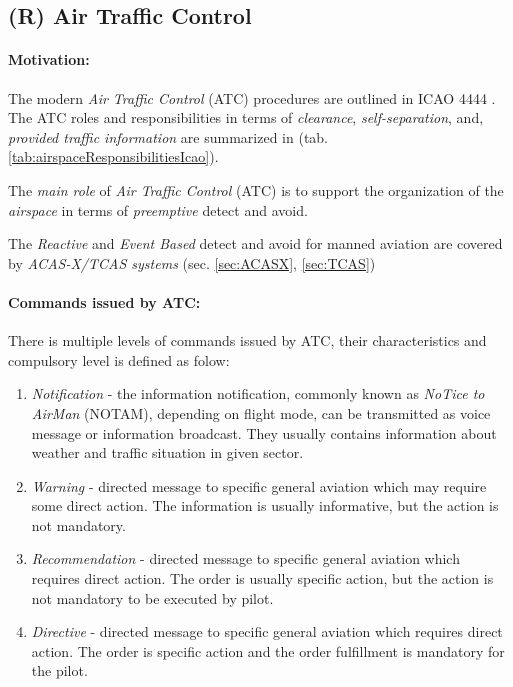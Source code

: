 \subsection{(R) Air Traffic Control}\label{sec:AirTrafficControl}
\paragraph{Motivation:} The modern \emph{Air Traffic Control} (ATC) procedures are outlined in ICAO 4444 \cite{icao4444}. The ATC roles and responsibilities in terms of \emph{clearance}, \emph{self-separation}, and, \emph{provided traffic information} are summarized in (tab. \ref{tab:airspaceResponsibilitiesIcao}). 

The \emph{main role} of \emph{Air Traffic Control} (ATC) is to support the organization of the \emph{airspace} in terms of \emph{preemptive} detect and avoid.

\begin{note}
    The \emph{Reactive} and \emph{Event Based} detect and avoid for manned aviation are covered by \emph{ACAS-X/TCAS systems} (sec. \ref{sec:ACASX}, \ref{sec:TCAS})
\end{note}

\paragraph{Commands issued by ATC:} There is multiple levels of commands issued by ATC, their characteristics and compulsory level is defined as folow:

\begin{enumerate}
    \item \emph{Notification} - the information notification, commonly known as \emph{NoTice to AirMan} (NOTAM), depending on flight mode, can be transmitted as voice message or information broadcast. They usually contains information about weather and traffic situation in given sector.
    
    \item \emph{Warning} - directed message to specific general aviation  which may require some direct action. The information is usually informative, but the action is not mandatory.
    
    \item \emph{Recommendation} - directed message to specific general aviation  which requires direct action. The order is usually specific action, but the action is not mandatory to be executed by pilot.
    
    \item \emph{Directive} - directed message to specific general aviation  which requires direct action. The order is specific action and the order fulfillment is mandatory for the pilot. 
\end{enumerate}

